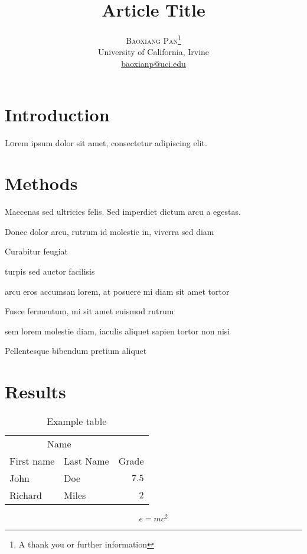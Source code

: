 \documentclass[twoside]{article}
\title{\vspace{-15mm}\fontsize{24pt}{10pt}\selectfont\textbf{Article Title}} %
\author{
\large
	\textsc{Baoxiang Pan}\thanks{A thank you or further information}\\[2mm] %
	\normalsize University of California, Irvine\\ %
	\normalsize \href{mailto:baoxianp@uci.edu}{baoxianp@uci.edu} %
		\vspace{-5mm}
}
\date{}
\begin{document}
\maketitle %
\thispagestyle{fancy} %
\begin{abstract}
\noindent \lipsum[1] %
\end{abstract}
\begin{multicols}{2} %
\section{Introduction}
\lettrine[nindent=0em,lines=3]{L} orem ipsum dolor sit amet, consectetur adipiscing elit.
\lipsum[2-3] %
\section{Methods}
Maecenas sed ultricies felis. Sed imperdiet dictum arcu a egestas. 
\begin{compactitem}
\item Donec dolor arcu, rutrum id molestie in, viverra sed diam
\item Curabitur feugiat
\item turpis sed auctor facilisis
\item arcu eros accumsan lorem, at posuere mi diam sit amet tortor
\item Fusce fermentum, mi sit amet euismod rutrum
\item sem lorem molestie diam, iaculis aliquet sapien tortor non nisi
\item Pellentesque bibendum pretium aliquet
\end{compactitem}
\lipsum[4] %
\section{Results}
\begin{table}[H]
\caption{Example table}
\centering
\begin{tabular}{llr}
\toprule
\multicolumn{2}{c}{Name} \\
		\cmidrule(r){1-2}
		First name & Last Name & Grade \\
			\midrule
			John & Doe & $7.5$ \\
				Richard & Miles & $2$ \\
\bottomrule
\end{tabular}
\end{table}
\lipsum[5] %
\begin{equation}
\label{eq:emc}
e = mc^2
\end{equation}
\lipsum[6] %

\end{multicols}
\end{document}
